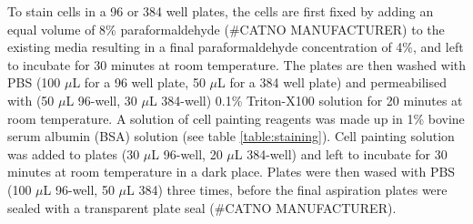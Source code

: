 \documentclass[a4paper,11pt,twoside,openright]{scrbook}
\begin{document}
To stain cells in a 96 or 384 well plates, the cells are first fixed by adding an equal volume of 8\% paraformaldehyde (\#CATNO MANUFACTURER) to the existing media resulting in a final paraformaldehyde concentration of 4\%, and left to incubate for 30 minutes at room temperature.
The plates are then washed with PBS (100 $\mu$L for a 96 well plate, 50 $\mu$L for a 384 well plate) and permeabilised with (50 $\mu$L 96-well, 30 $\mu$L 384-well) 0.1\% Triton-X100 solution for 20 minutes at room temperature.
A solution of cell painting reagents was made up in 1\% bovine serum albumin (BSA) solution (see table \ref{table:staining}).
Cell painting solution was added to plates (30 $\mu$L 96-well, 20 $\mu$L 384-well) and left to incubate for 30 minutes at room temperature in a dark place.
Plates were then wased with PBS (100 $\mu$L 96-well, 50 $\mu$L 384) three times, before the final aspiration plates were sealed with a transparent plate seal (\#CATNO MANUFACTURER).
\end{document}
